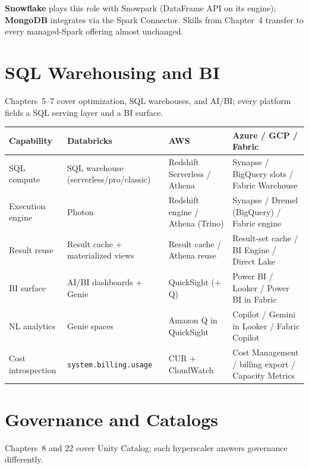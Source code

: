 \noindent \textbf{Snowflake} plays this role with Snowpark (DataFrame API on its engine);
\textbf{MongoDB} integrates via the Spark Connector. Skills from Chapter~4 transfer to every
managed-Spark offering almost unchanged.

\section{SQL Warehousing and BI}
%
Chapters~5--7 cover optimization, SQL warehouses, and AI/BI; every platform fields a
SQL serving layer and a BI surface.

\begin{center}
\footnotesize
\begin{tabular}{@{}p{3.0cm}p{3.4cm}p{3.2cm}p{3.2cm}@{}}
\toprule
\textbf{Capability} & \textbf{Databricks} & \textbf{AWS} & \textbf{Azure / GCP / Fabric} \\
\midrule
SQL compute & SQL warehouse (serverless/pro/classic) & Redshift Serverless / Athena & Synapse / BigQuery slots / Fabric Warehouse \\
Execution engine & Photon & Redshift engine / Athena (Trino) & Synapse / Dremel (BigQuery) / Fabric engine \\
Result reuse & Result cache + materialized views & Result cache / Athena reuse & Result-set cache / BI Engine / Direct Lake \\
BI surface & AI/BI dashboards + Genie & QuickSight (+ Q) & Power BI / Looker / Power BI in Fabric \\
NL analytics & Genie spaces & Amazon Q in QuickSight & Copilot / Gemini in Looker / Fabric Copilot \\
Cost introspection & \texttt{system.billing.usage} & CUR + CloudWatch & Cost Management / billing export / Capacity Metrics \\
\bottomrule
\end{tabular}
\end{center}

\section{Governance and Catalogs}
%
Chapters~8 and 22 cover Unity Catalog; each hyperscaler answers governance
differently.

